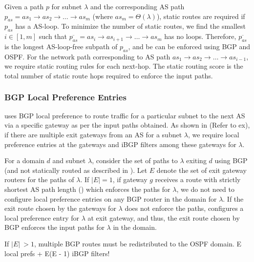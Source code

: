 Given a path $p$ for subnet $\lambda$ and 
the corresponding AS path $p_{as}
= as_1 \rightarrow as_2 \rightarrow \ldots \rightarrow as_m$ (where
$as_m = \Theta(\lambda)$), static
routes are required if $p_{as}$ has a AS-loop. 
To minimize
the number of static routes, we find 
the smallest $i \in [1,m]$ 
such that $\overline{p_{as}} = as_i \rightarrow as_{i+1}
\rightarrow \ldots \rightarrow as_m$ has no loops. 
Therefore, $\overline{p_{as}}$ is the longest AS-loop-free
subpath of $p_{as}$, and be can be enforced using BGP and OSPF. For the 
network path corresponding to AS path $as_1 \rightarrow as_2 
\rightarrow \ldots \rightarrow as_{i-1}$, we require static
routing rules for each next-hop. The static routing score
is the total number of static route hops required to enforce
the input paths.

\subsubsection{BGP Local Preference Entries}
\name uses BGP local preference to route traffic
for a particular subnet to the next AS via a specific 
gateway as per the input paths obtained. 
As shown in \Cref{} (Refer
to ex), if there are multiple exit gateways from an AS 
for a subnet $\lambda$, we require local preference entries at the 
gateways and iBGP filters among these gateways for $\lambda$.

For a domain $d$ and subnet $\lambda$, consider the set 
of paths to $\lambda$ exiting $d$ using BGP (and not statically
routed as described in ). Let $E$ denote the
set of exit gateway routers for the paths of $\lambda$. 
If $|E| = 1$, if gateway $g$ receives a route with 
strictly shortest AS path length () 
which enforces the paths
for $\lambda$, we do not need to configure local preference
entries on any BGP router in the domain for $\lambda$. If
the exit route chosen by the gateways for $\lambda$ does not 
enforce the paths, \name configures a local preference entry
for $\lambda$ at exit gateway, and thus, the exit route chosen
by BGP enforces the input paths for $\lambda$ in the domain.

If $|E| ~> 1$, multiple BGP routes must be redistributed to 
the OSPF domain.
E local prefs + E(E - 1) iBGP filters!

